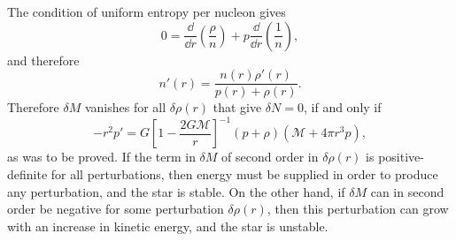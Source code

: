 The condition of uniform entropy per nucleon gives
\[
  0=\frac{\dd}{\dd r}\left(\frac{\rho}{n}\right)
  +p\frac{\dd}{\dd r}\left(\frac1n\right),
\]
and therefore
\[
  n'(r)=\frac{n(r)\rho'(r)}{p(r)+\rho(r)}.
\]
Therefore \(\delta M\) vanishes for all \(\delta\rho(r)\) that give
\(\delta N=0\), if and only if
\[
  -r^2p'
  =
  G\left[1-\frac{2G\mathcal{M}}r\right]^{-1}
  (p+\rho)\left(\mathcal{M}+4\pi r^3p\right),
\]
as was to be proved. If the term in \(\delta M\) of second order in
\(\delta\rho(r)\) is positive-definite for all perturbations, then energy must
be supplied in order to produce any perturbation, and the star is stable. On
the other hand, if \(\delta M\) can in second order be negative for some
perturbation \(\delta\rho(r)\), then this perturbation can grow with an
increase in kinetic energy, and the star is unstable.
